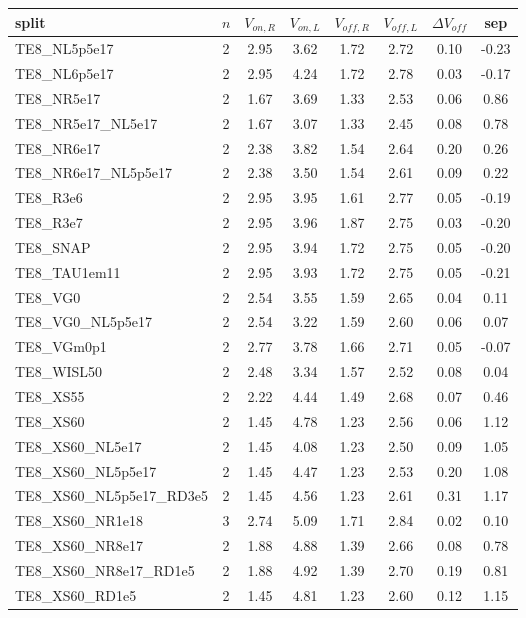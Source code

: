 \begin{tabular}{@{}l@{\,}c@{\,}c@{\,}c@{\,}c@{\,}c@{\,}c@{\,}c@{}}\toprule
split & $n$ & $V_{on,R}$ & $V_{on,L}$ & $V_{off,R}$ & $V_{off,L}$ & $\Delta V_{off}$ & sep \\ \midrule
TE8\_NL5p5e17 & 2 & 2.95 & 3.62 & 1.72 & 2.72 & 0.10 & -0.23 \\
TE8\_NL6p5e17 & 2 & 2.95 & 4.24 & 1.72 & 2.78 & 0.03 & -0.17 \\
TE8\_NR5e17 & 2 & 1.67 & 3.69 & 1.33 & 2.53 & 0.06 & 0.86 \\
TE8\_NR5e17\_NL5e17 & 2 & 1.67 & 3.07 & 1.33 & 2.45 & 0.08 & 0.78 \\
TE8\_NR6e17 & 2 & 2.38 & 3.82 & 1.54 & 2.64 & 0.20 & 0.26 \\
TE8\_NR6e17\_NL5p5e17 & 2 & 2.38 & 3.50 & 1.54 & 2.61 & 0.09 & 0.22 \\
TE8\_R3e6 & 2 & 2.95 & 3.95 & 1.61 & 2.77 & 0.05 & -0.19 \\
TE8\_R3e7 & 2 & 2.95 & 3.96 & 1.87 & 2.75 & 0.03 & -0.20 \\
TE8\_SNAP & 2 & 2.95 & 3.94 & 1.72 & 2.75 & 0.05 & -0.20 \\
TE8\_TAU1em11 & 2 & 2.95 & 3.93 & 1.72 & 2.75 & 0.05 & -0.21 \\
TE8\_VG0 & 2 & 2.54 & 3.55 & 1.59 & 2.65 & 0.04 & 0.11 \\
TE8\_VG0\_NL5p5e17 & 2 & 2.54 & 3.22 & 1.59 & 2.60 & 0.06 & 0.07 \\
TE8\_VGm0p1 & 2 & 2.77 & 3.78 & 1.66 & 2.71 & 0.05 & -0.07 \\
TE8\_WISL50 & 2 & 2.48 & 3.34 & 1.57 & 2.52 & 0.08 & 0.04 \\
TE8\_XS55 & 2 & 2.22 & 4.44 & 1.49 & 2.68 & 0.07 & 0.46 \\
TE8\_XS60 & 2 & 1.45 & 4.78 & 1.23 & 2.56 & 0.06 & 1.12 \\
TE8\_XS60\_NL5e17 & 2 & 1.45 & 4.08 & 1.23 & 2.50 & 0.09 & 1.05 \\
TE8\_XS60\_NL5p5e17 & 2 & 1.45 & 4.47 & 1.23 & 2.53 & 0.20 & 1.08 \\
TE8\_XS60\_NL5p5e17\_RD3e5 & 2 & 1.45 & 4.56 & 1.23 & 2.61 & 0.31 & 1.17 \\
TE8\_XS60\_NR1e18 & 3 & 2.74 & 5.09 & 1.71 & 2.84 & 0.02 & 0.10 \\
TE8\_XS60\_NR8e17 & 2 & 1.88 & 4.88 & 1.39 & 2.66 & 0.08 & 0.78 \\
TE8\_XS60\_NR8e17\_RD1e5 & 2 & 1.88 & 4.92 & 1.39 & 2.70 & 0.19 & 0.81 \\
TE8\_XS60\_RD1e5 & 2 & 1.45 & 4.81 & 1.23 & 2.60 & 0.12 & 1.15 \\

\end{tabular}
